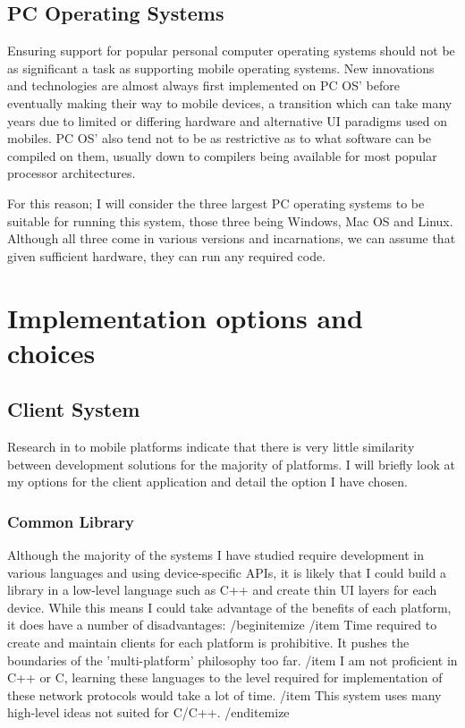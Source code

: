 \documentclass[a4papert,11pt,notitlepage]{article}
\begin{document}
\begin{appendices}
\begin{description}
\end{description}

\subsection{PC Operating Systems}
Ensuring support for popular personal computer operating systems should not be as significant a task as supporting mobile operating systems. New innovations and technologies are almost always first implemented on PC OS' before eventually making their way to mobile devices, a transition which can take many years due to limited or differing hardware and alternative UI paradigms used on mobiles. PC OS' also tend not to be as restrictive as to what software can be compiled on them, usually down to compilers being available for most popular processor architectures.

For this reason; I will consider the three largest PC operating systems to be suitable for running this system, those three being Windows, Mac OS and Linux. Although all three come in various versions and incarnations, we can assume that given sufficient hardware, they can run any required code.

\pagebreak
\section{Implementation options and choices}
\label{app:implementationoptions}
\subsection{Client System}
Research in to mobile platforms indicate that there is very little similarity between development solutions for the majority of platforms. I will briefly look at my options for the client application and detail the option I have chosen.

\subsubsection{Common Library}
Although the majority of the systems I have studied require development in various languages and using device-specific APIs, it is likely that I could build a library in a low-level language such as C++ and create thin UI layers for each device. While this means I could take advantage of the benefits of each platform, it does have a number of disadvantages:
/begin{itemize}
/item Time required to create and maintain clients for each platform is prohibitive. It pushes the boundaries of the 'multi-platform' philosophy too far.
/item I am not proficient in C++ or C, learning these languages to the level required for implementation of these network protocols would take a lot of time.
/item This system uses many high-level ideas not suited for C/C++.
/end{itemize}


\end{appendices}
\end{document}

